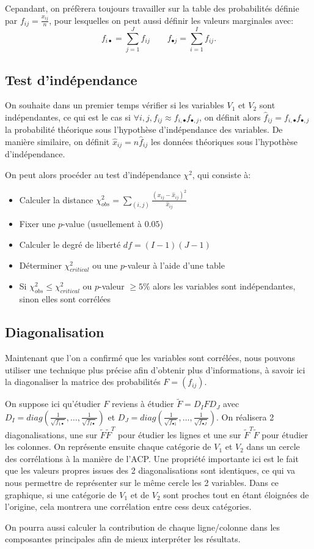 Cepandant, on préfèrera toujours travailler sur la table des probabilités définie par $f_{ij} = \frac{x_{ij}}{n}$, pour lesquelles on peut aussi définir les valeurs marginales avec: 
\begin{equation}
  f_{i\bullet} = \sum_{j=1}^J f_{ij} \qquad
  f_{\bullet j} = \sum_{i=1}^I f_{ij}.
\end{equation}

\subsection{Test d'indépendance}

On souhaite dans un premier temps vérifier si les variables $V_1$ et $V_2$ sont indépendantes, ce qui est le cas si $\forall i, j, f_{ij} \approx f_{i,\bullet}f_{\bullet, j}$, on définit alors $\hat{f}_{ij} = f_{i,\bullet}f_{\bullet, j}$ la probabilité théorique sous l'hypothèse d'indépendance des variables. 
De manière similaire, on définit $\hat{x}_{ij} = n\hat{f}_{ij}$ les données théoriques sous l'hypothèse d'indépendance. 

On peut alors procéder au test d'indépendance $\chi^2$, qui consiste à:
\begin{itemize}
  \item Calculer la distance $\chi_{obs}^2 = \sum_{(i,j)} \frac{(x_{ij} - \hat{x}_{ij})^2}{\hat{x}_{ij}}$ 
  \item Fixer une $p$-value (usuellement à $0.05$)
  \item Calculer le degré de liberté $df = (I - 1)(J - 1)$ 
  \item Déterminer $\chi_{critical}^2$ ou une $p$-valeur à l'aide d'une table 
  \item Si $\chi_{obs}^2 \leq \chi_{critical}^2$ ou $p$-valeur $\geq 5\%$ alors les variables sont indépendantes, sinon elles sont corrélées
\end{itemize}

\subsection{Diagonalisation}

Maintenant que l'on a confirmé que les variables sont corrélées, nous pouvons utiliser une technique plus précise afin d'obtenir plus d'informations, à savoir ici la diagonaliser la matrice des probabilités $F = (f_{ij})$.

On suppose ici qu'étudier $F$ reviens à étudier $\tilde{F} = D_IFD_J$ avec $D_I = diag(\frac{1}{\sqrt{f_{1 \bullet}}}, \dots, \frac{1}{\sqrt{f_{I\bullet}}})$ et $D_J = diag(\frac{1}{\sqrt{f_{\bullet 1}}}, \dots, \frac{1}{\sqrt{f_{\bullet J}}})$.
On réalisera 2 diagonalisations, une sur $\tilde{F}\tilde{F}^T$ pour étudier les lignes et une sur $\tilde{F}^T\tilde{F}$ pour étudier les colonnes.
On représente ensuite chaque catégorie de $V_1$ et $V_2$ dans un cercle des corrélations à la manière de l'ACP.
Une propriété importante ici est le fait que les valeurs propres issues des 2 diagonalisations sont identiques, ce qui va nous permettre de représenter sur le même cercle les 2 variables. Dans ce graphique, si une catégorie de $V_1$ et de $V_2$ sont proches tout en étant éloignées de l'origine, cela montrera une corrélation entre cess deux catégories.

On pourra aussi calculer la contribution de chaque ligne/colonne dans les composantes principales afin de mieux interpréter les résultats.
